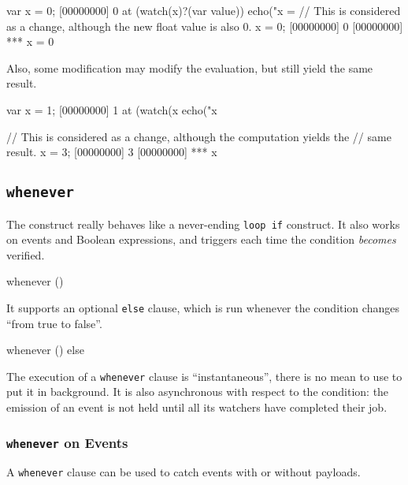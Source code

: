 \begin{urbiscript}[firstnumber=1]
var x = 0;
[00000000] 0
at (watch(x)?(var value))
  echo("x = %
// This is considered as a change, although the new float value is also 0.
x = 0;
[00000000] 0
[00000000] *** x = 0
\end{urbiscript}

Also, some modification may modify the evaluation, but still yield the same
result.

\begin{urbiscript}[firstnumber=1]
var x = 1;
[00000000] 1
at (watch(x %
  echo("x %

// This is considered as a change, although the computation yields the
// same result.
x = 3;
[00000000] 3
[00000000] *** x %
\end{urbiscript}


\subsection{\lstinline|whenever|}
\label{sec:lang:whenever}

The  construct really behaves like a never-ending
\lstinline|loop if| construct.  It also works on events and Boolean
expressions, and triggers each time the condition \emph{becomes} verified.

\begin{urbiunchecked}
whenever ()
\end{urbiunchecked}

It supports an optional \lstinline|else| clause, which is run whenever
the condition changes ``from true to false''.

\begin{urbiunchecked}
whenever ()
else
\end{urbiunchecked}

The execution of a \lstinline|whenever| clause is ``instantaneous'',
there is no mean to use \samp{,} to put it in background.  It is also
asynchronous with respect to the condition: the emission of an event
is not held until all its watchers have completed their job.

\subsubsection{\lstinline'whenever' on Events}

A \lstinline'whenever' clause can be used to catch events with or
without payloads.

